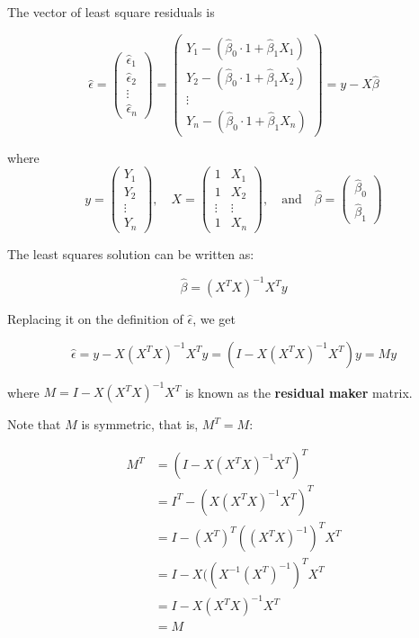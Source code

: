 The vector of least square residuals is

\[ \hat{\epsilon} = \begin{pmatrix}
\hat{\epsilon}_{1} \\
\hat{\epsilon}_{2} \\
\vdots \\
\hat{\epsilon}_{n}
\end{pmatrix} = \begin{pmatrix}
Y_{1} - (\hat{\beta}_{0} \cdot 1 + \hat{\beta}_{1} X_{1}) \\
Y_{2} - (\hat{\beta}_{0} \cdot 1 + \hat{\beta}_{1} X_{2}) \\
\vdots \\
Y_{n} - (\hat{\beta}_{0} \cdot 1 + \hat{\beta}_{1} X_{n})
\end{pmatrix} = 
y - X \hat{\beta}
\]

where \[
y = \begin{pmatrix}
Y_{1} \\
Y_{2} \\
\vdots \\
Y_{n}
\end{pmatrix}
, \quad
X = \begin{pmatrix}
1 & X_{1} \\
1 & X_{2} \\
\vdots & \vdots \\
1 & X_{n}
\end{pmatrix},
\quad \text{and} \quad
\hat{\beta} = \begin{pmatrix}
\hat{\beta}_{0} \\
\hat{\beta}_{1}
\end{pmatrix}
\]

The least squares solution can be written as:

\[\hat{\beta} = (X^T X)^{-1} X^T y\]

Replacing it on the definition of \(\hat{\epsilon}\), we get

\[ \hat{\epsilon} = y - X (X^T X)^{-1} X^T y = (I - X (X^T X)^{-1} X^T) y = M y\]

where \(M = I - X (X^T X)^{-1} X^T\) is known as the \textbf{residual
maker} matrix.

Note that \(M\) is symmetric, that is, \(M^T = M\):

\begin{align*}
M^T &= (I - X (X^T X)^{-1} X^T)^T  \\
&= I^T - (X (X^T X)^{-1} X^T)^T \\
&= I - (X^T)^T ((X^T X)^{-1})^T X^T \\
&= I - X ((X^{-1}(X^T)^{-1})^T X^T \\
&= I -  X (X^T X)^{-1} X^T \\
&= M
\end{align*}

